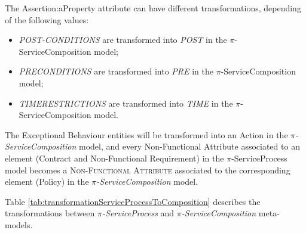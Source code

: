 The {\sc  Assertion:aProperty} attribute can have different transformations,
depending of the following values:

\begin{itemize}
\item \textit{POST-CONDITIONS} are transformed into \textit{POST} in
the $\pi$-ServiceComposition model;
\item \textit{PRECONDITIONS} are transformed into \textit{PRE}
in the $\pi$-ServiceComposition model;
\item \textit{TIMERESTRICTIONS} are transformed into \textit{TIME}
in the $\pi$-ServiceComposition model.
\end{itemize}

The {\sc Exceptional Behaviour} entities will be
transformed into an {\sc Action} in the \textit{$\pi$-ServiceComposition} model,
and every {\sc Non-Functional Attribute} associated to an element
({\sc Contract} and {\sc Non-Functional Requirement}) in the
$\pi$-ServiceProcess model becomes a \textsc{Non-Functional Attribute}
associated to the corresponding element ({\sc Policy}) in the \textit{$\pi$-ServiceComposition}
model.

Table \ref{tab:transformationServiceProcessToComposition} describes the
transformations between \textit{$\pi$-ServiceProcess} and
\textit{$\pi$-ServiceComposition} meta-models.

